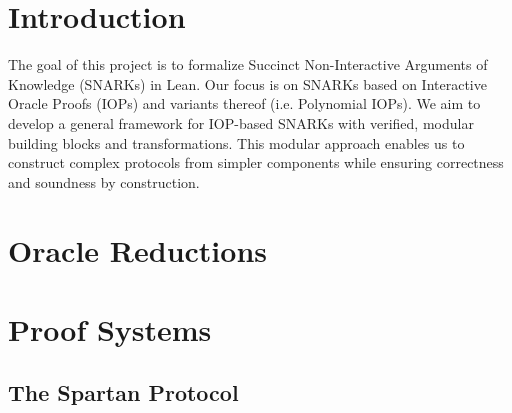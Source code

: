 %

\chapter{Introduction}

The goal of this project is to formalize Succinct Non-Interactive Arguments of Knowledge (SNARKs) in
Lean. Our focus is on SNARKs based on Interactive Oracle Proofs (IOPs) and variants thereof (i.e.
Polynomial IOPs). We aim to develop a general framework for IOP-based SNARKs with verified, modular
building blocks and transformations. This modular approach enables us to construct complex protocols
from simpler components while ensuring correctness and soundness by construction.

\chapter{Oracle Reductions}\label{chap:oracle_reductions}





\chapter{Proof Systems}\label{chap:proof_systems}











\section{The Spartan Protocol}

